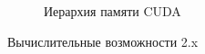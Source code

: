 \documentclass[a4paper,14pt,russian]{extreport}
\begin{document}
\begin{figure}[h]
\caption{Иерархия памяти CUDA}
\label{ris:mem_hierarchy}
\end{figure}
\par 
Вычислительные возможности 2.x
\end{document}
